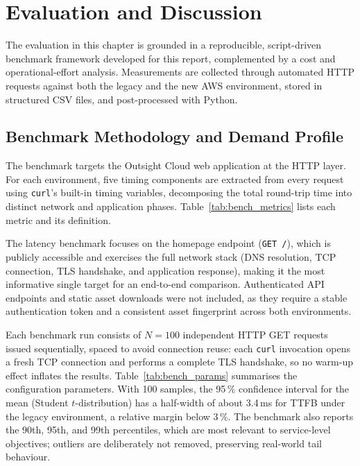 \chapter{Evaluation and Discussion}
\label{chap:evaluation}

The evaluation in this chapter is grounded in a reproducible, script-driven benchmark framework developed for this report, complemented by a cost and operational-effort analysis. Measurements are collected through automated HTTP requests against both the legacy and the new AWS environment, stored in structured CSV files, and post-processed with Python.

\section{Benchmark Methodology and Demand Profile}
The benchmark targets the Outsight Cloud web application at the HTTP layer. For each environment, five timing components are extracted from every request using \texttt{curl}'s built-in timing variables, decomposing the total round-trip time into distinct network and application phases. Table~\ref{tab:bench_metrics} lists each metric and its definition.



The latency benchmark focuses on the homepage endpoint (\texttt{GET /}), which is publicly accessible and exercises the full network stack (DNS resolution, TCP connection, TLS handshake, and application response), making it the most informative single target for an end-to-end comparison. Authenticated API endpoints and static asset downloads were not included, as they require a stable authentication token and a consistent asset fingerprint across both environments.

Each benchmark run consists of $N = 100$ independent HTTP GET requests issued sequentially, spaced to avoid connection reuse: each \texttt{curl} invocation opens a fresh TCP connection and performs a complete TLS handshake, so no warm-up effect inflates the results. Table~\ref{tab:bench_params} summarises the configuration parameters. With 100 samples, the 95\,\% confidence interval for the mean (Student $t$-distribution) has a half-width of about 3.4\,ms for TTFB under the legacy environment, a relative margin below 3\,\%. The benchmark also reports the 90th, 95th, and 99th percentiles, which are most relevant to service-level objectives; outliers are deliberately not removed, preserving real-world tail behaviour.

